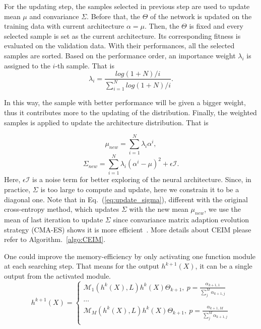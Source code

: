 \documentclass[letterpaper]{article} \usepackage{aaai19}  \usepackage{times}  \usepackage{helvet} \usepackage{courier}  \usepackage[hyphens]{url}  \usepackage{graphicx} \urlstyle{rm} \def\UrlFont{\rm}  \usepackage{graphicx}  \frenchspacing  \setlength{\pdfpagewidth}{8.5in}  \setlength{\pdfpageheight}{11in}
\begin{document}
For the updating step, the samples selected in previous step are used to update mean $\mu$ and convariance $\Sigma$. Before that, the $\Theta$ of the network is updated on the training data with current architecture $\alpha = \mu$. Then, the $\Theta$ is fixed and every selected sample is set as the current architecture. Its corresponding fitness is evaluated on the validation data. With their performances, all the selected samples are sorted. 
Based on the performance order, an importance weight $\lambda_{i}$ is assigned to the $i$-th sample. That is 
\begin{equation}\label{eq:weight_smaple}
\lambda_{i}= \frac{log(1+N)/i}{\sum_{i=1}^{N}log(1+N)/i}. 
\end{equation}

\noindent In this way, the sample with better performance will be given a bigger weight, thus it contributes more to the updating of the distribution. Finally, the weighted samples is applied to update the architecture distribution. That is

\begin{equation}\label{eq:update_mu}
\mu_{new} = \sum_{i=1}^{N}\lambda_{i}\alpha^i,
\end{equation}
\begin{equation}\label{eq:update_sigma}
\Sigma_{new} = \sum_{i=1}^{N}\lambda_{i}(\alpha^i- \mu)^2 + \epsilon\mathcal{I}.
\end{equation}
Here, $\epsilon\mathcal{I}$ is a noise term for better exploring of the neural architecture. Since, in practice, $\Sigma$ is too large to compute and update, here we constrain it to be a diagonal one. Note that in Eq.~(\ref{eq:update_sigma}), different with the original cross-entropy method, which updates $\Sigma$ with the new mean $\mu_{new}$, we use the mean of last iteration to update $\Sigma$ since convariance matrix adaption evolution strategy (CMA-ES) shows it is more efficient~\cite{hansen2016cma}. More details about CEIM please refer to Algorithm.~\ref{algo:CEIM}.

One could improve the memory-efficiency by only activating one function module at each searching step. That means for the output $h^{k+1}(X)$, it can be a single output from the activated module.   
\begin{equation}
    h^{k+1}(X) = \left\{\begin{matrix}
 \mathcal{M}_1(h^{k}(X),L)h^{k}(X)\Theta_{k+1},~p= \frac{\alpha_{k+1,1}}{\sum_{j}^{M} \alpha_{k+1,j}}\\ 
 \cdots \\ 
 \mathcal{M}_M(h^{k}(X),L)h^{k}(X)\Theta_{k+1},~p= \frac{\alpha_{k+1,M}}{\sum_{j}^{M} \alpha_{k+1,j}}\\
\end{matrix}\right.
\end{equation}
\end{document}
